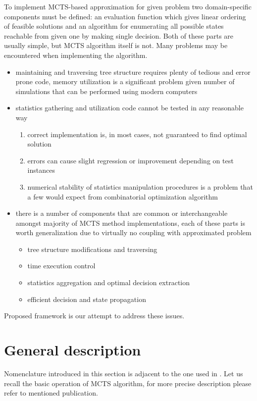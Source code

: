 To implement MCTS-based approximation for given problem two domain-specific
components must be defined: an evaluation function which gives linear ordering
of feasible solutions and an algorithm for enumerating all possible states
reachable from given one by making single decision.
Both of these parts are usually simple, but MCTS algorithm itself is not. Many
problems may be encountered when implementing the algorithm.
\begin{itemize}
  \item maintaining and traversing tree structure requires plenty of tedious
    and error prone code, memory utilization is a significant problem given
    number of simulations that can be performed using modern computers
  \item statistics gathering and utilization code cannot be tested in any reasonable way
    \begin{enumerate}
      \item correct implementation is, in most cases, not guaranteed to find optimal solution
      \item errors can cause slight regression or improvement depending on test instances
      \item numerical stability of statistics manipulation procedures is a
      problem that a few would expect from combinatorial optimization algorithm
    \end{enumerate}
  \item there is a number of components that are common or interchangeable
    amongst majority of MCTS method implementations, each of these parts is
    worth generalization due to virtually no coupling with approximated problem
    \begin{itemize}
      \item tree structure modifications and traversing
      \item time execution control
      \item statistics aggregation and optimal decision extraction
      \item efficient decision and state propagation
    \end{itemize}
\end{itemize}

Proposed framework is our attempt to address these issues.

\section{General description}
Nomenclature introduced in this section is adjacent to the one used in
\cite{MCTSsurvey}.  Let us recall the basic operation of MCTS algorithm, for
more precise description please refer to mentioned publication.

